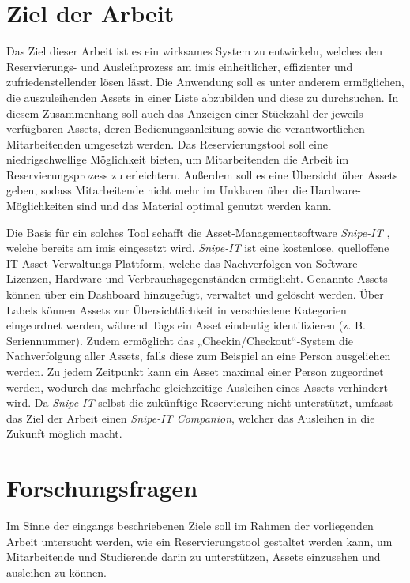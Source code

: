 \section{Ziel der Arbeit}
Das Ziel dieser Arbeit ist es ein wirksames System zu entwickeln, welches den Reservierungs- und
Ausleihprozess am \ac{imis} einheitlicher, effizienter und zufriedenstellender lösen lässt. Die
Anwendung soll es unter anderem ermöglichen, die auszuleihenden Assets in einer Liste abzubilden und
diese zu durchsuchen. In diesem Zusammenhang soll auch das Anzeigen einer Stückzahl der jeweils
verfügbaren Assets, deren Bedienungsanleitung sowie die verantwortlichen Mitarbeitenden umgesetzt
werden. Das Reservierungstool soll eine niedrigschwellige Möglichkeit bieten, um Mitarbeitenden die
Arbeit im Reservierungsprozess zu erleichtern. Außerdem soll es eine Übersicht über Assets
geben, sodass Mitarbeitende nicht mehr im Unklaren über die Hardware-Möglichkeiten sind und das
Material optimal genutzt werden kann.

Die Basis für ein solches Tool schafft die Asset-Managementsoftware \textit{Snipe-IT}
\cite{noauthor_home_nodate}, welche bereits am \ac{imis} eingesetzt wird. \textit{Snipe-IT} ist eine
kostenlose, quelloffene IT-Asset-Verwaltungs-Plattform, welche das Nachverfolgen von
Software-Lizenzen, Hardware und Verbrauchsgegenständen ermöglicht. Genannte Assets können über ein
Dashboard hinzugefügt, verwaltet und gelöscht werden. Über Labels können Assets zur
Übersichtlichkeit in verschiedene Kategorien eingeordnet werden, während Tags ein Asset eindeutig
identifizieren (z. B. Seriennummer). Zudem ermöglicht das „Checkin/Checkout“-System die
Nachverfolgung aller Assets, falls diese zum Beispiel an eine Person ausgeliehen werden. Zu jedem
Zeitpunkt kann ein Asset maximal einer Person zugeordnet werden, wodurch das mehrfache gleichzeitige
Ausleihen eines Assets verhindert wird. Da \textit{Snipe-IT} selbst die zukünftige Reservierung
nicht unterstützt, umfasst das Ziel der Arbeit einen \textit{Snipe-IT Companion}, welcher das
Ausleihen in die Zukunft möglich macht.


\section{Forschungsfragen}
Im Sinne der eingangs beschriebenen Ziele soll im Rahmen der vorliegenden Arbeit untersucht werden,
wie ein Reservierungstool gestaltet werden kann, um Mitarbeitende und Studierende darin zu
unterstützen, Assets einzusehen und ausleihen zu können.

